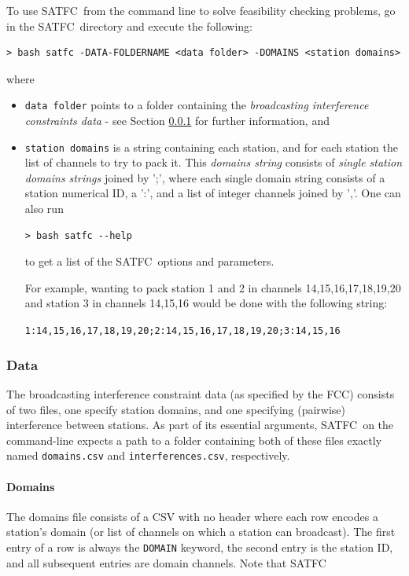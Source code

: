 \documentclass[
10pt, %
a4paper, %
oneside, %
headinclude,footinclude, %
BCOR5mm, %
]{scrartcl}
\newcommand{\SATFC}{\textsc{SATFC}~}
\begin{document}
To use \SATFC from the command line to solve feasibility checking problems, go in the \SATFC directory and execute the following:
\begin{lstlisting}[style=Bash]
> bash satfc -DATA-FOLDERNAME <data folder> -DOMAINS <station domains>
\end{lstlisting}
where 
\begin{itemize}
\item \texttt{data folder} points to a folder containing the \emph{broadcasting interference constraints data} - see Section \ref{sec:data} for further information, and
\item \texttt{station domains} is a string containing each station, and for each station the list of channels to try to pack it. This \emph{domains string} consists of \emph{single station domains strings} joined by ';', where each single domain string consists of a station numerical ID, a ':', and a list of integer channels joined by ','. One can also run
\begin{lstlisting}[style=Bash]
> bash satfc --help
\end{lstlisting}
to get a list of the \SATFC options and parameters.

For example, wanting to pack station 1 and 2 in channels 14,15,16,17,18,19,20 and station 3 in channels 14,15,16 would be done with the following string:
\begin{center}
\texttt{1:14,15,16,17,18,19,20;2:14,15,16,17,18,19,20;3:14,15,16}
\end{center}
\end{itemize}

\subsubsection{Data}\label{sec:data}

The broadcasting interference constraint data (as specified by the FCC) consists of two files, one specify station domains, and one specifying (pairwise) interference between stations. As part of its essential arguments, \SATFC on the command-line expects a path to a folder containing both of these files exactly named \texttt{domains.csv} and \texttt{interferences.csv}, respectively.

\paragraph{Domains} The domains file consists of a CSV with no header where each row encodes a station's domain (or list of channels on which a station can broadcast). The first entry of a row is always the \texttt{DOMAIN} keyword, the second entry is the station ID, and all subsequent entries are domain channels. Note that \SATFC 
\end{document}
